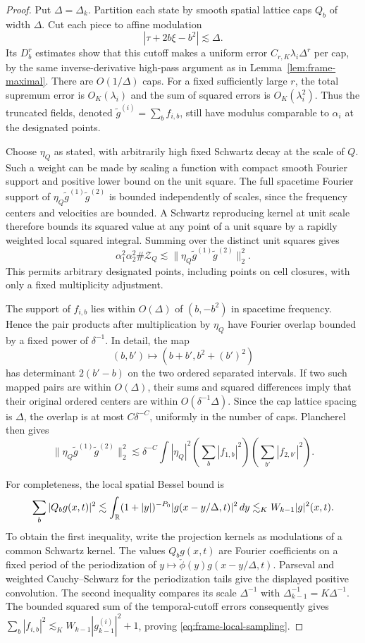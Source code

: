 \begin{proof}
Put $\Delta=\Delta_k$.  Partition each state by smooth spatial
lattice caps $Q_b$ of width $\Delta$.  Cut each piece to affine
modulation
\[
 |\tau+2b\xi-b^2|\lesssim\Delta.
\]
Its $D_b^r$ estimates show that this cutoff makes a uniform error
$C_{r,K}\lambda_i\Delta^r$ per cap, by the same inverse-derivative
high-pass argument as in Lemma~\ref{lem:frame-maximal}.
There are $O(1/\Delta)$ caps.  For a fixed sufficiently large $r$,
the total supremum error is $O_K(\lambda_i)$ and the sum of squared
errors is $O_K(\lambda_i^2)$.  Thus the truncated fields, denoted
$\widetilde g^{(i)}=\sum_bf_{i,b}$, still have modulus comparable
to $\alpha_i$ at the designated points.

Choose $\eta_Q$ as stated, with arbitrarily high fixed Schwartz
decay at the scale of $Q$.  Such a weight can be made by scaling a
function with compact smooth Fourier support and positive lower
bound on the unit square.  The full spacetime Fourier support of
$\eta_Q\widetilde g^{(1)}\widetilde g^{(2)}$ is bounded independently
of scales, since the frequency centers and velocities are bounded.
A Schwartz reproducing kernel at unit scale therefore bounds its
squared value at any point of a unit square by a rapidly weighted
local squared integral.  Summing over the distinct unit squares gives
\[
 \alpha_1^2\alpha_2^2\#\mathcal Z_Q
 \lesssim\|\eta_Q\widetilde g^{(1)}\widetilde g^{(2)}\|_2^2.
\]
This permits arbitrary designated points, including points on cell
closures, with only a fixed multiplicity adjustment.

The support of $f_{i,b}$ lies within $O(\Delta)$ of
$(b,-b^2)$ in spacetime frequency.  Hence the pair products after
multiplication by $\eta_Q$ have Fourier overlap bounded by a fixed
power of $\delta^{-1}$.  In detail, the map
\[
 (b,b')\longmapsto(b+b',b^2+(b')^2)
\]
has determinant $2(b'-b)$ on the two ordered separated intervals.
If two such mapped pairs are within $O(\Delta)$, their sums and
squared differences imply that their original ordered centers are
within $O(\delta^{-1}\Delta)$.  Since the cap lattice spacing is
$\Delta$, the overlap is at most $C\delta^{-C}$, uniformly in
the number of caps.  Plancherel then gives
\[
 \|\eta_Q\widetilde g^{(1)}\widetilde g^{(2)}\|_2^2
 \lesssim\delta^{-C}\int|\eta_Q|^2
                 \left(\sum_b|f_{1,b}|^2\right)
                 \left(\sum_{b'}|f_{2,b'}|^2\right).
\]

For completeness, the local spatial Bessel bound is
\[
 \sum_b|Q_bg(x,t)|^2
 \lesssim\int_\mathbb R(1+|y|)^{-P_0}|g(x-y/\Delta,t)|^2\,dy
 \lesssim_K W_{k-1}|g|^2(x,t).
\]
To obtain the first inequality, write the projection kernels as
modulations of a common Schwartz kernel.  The values $Q_bg(x,t)$
are Fourier coefficients on a fixed period of the periodization of
$y\mapsto\check\phi(y)g(x-y/\Delta,t)$.  Parseval and weighted
Cauchy--Schwarz for the periodization tails give the displayed
positive convolution.  The second inequality compares its scale
$\Delta^{-1}$ with $\Delta_{k-1}^{-1}=K\Delta^{-1}$.
The bounded squared sum of the temporal-cutoff errors consequently
gives
$\sum_b|f_{i,b}|^2\lesssim_KW_{k-1}|g_{k-1}^{(i)}|^2+1$,
proving \eqref{eq:frame-local-sampling}.
\end{proof}


